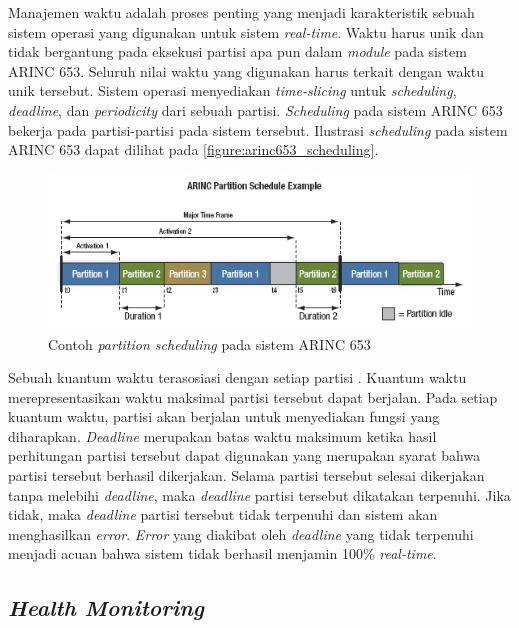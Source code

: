 Manajemen waktu adalah proses penting yang menjadi karakteristik sebuah sistem operasi yang
digunakan untuk sistem \textit{real-time}. Waktu harus unik dan tidak bergantung pada eksekusi
partisi apa pun dalam \textit{module} pada sistem ARINC 653. Seluruh nilai waktu yang digunakan
harus terkait dengan waktu unik tersebut. Sistem operasi menyediakan \textit{time-slicing}
untuk \textit{scheduling}, \textit{deadline}, dan \textit{periodicity} dari sebuah partisi.
\textit{Scheduling} pada sistem ARINC 653 bekerja pada partisi-partisi pada sistem tersebut.
Ilustrasi \textit{scheduling} pada sistem ARINC 653 dapat dilihat pada
\autoref{figure:arinc653_scheduling}.

\begin{figure}[htbp]
    \centering
    \includegraphics[scale=0.8]{resources/arinc653_scheduling.jpg}
    \caption[Contoh \textit{partition scheduling} pada sistem ARINC 653]{Contoh \textit{partition scheduling} pada sistem ARINC 653 \citep{Larry2009}}
    \label{figure:arinc653_scheduling}
\end{figure}

Sebuah kuantum waktu terasosiasi dengan setiap partisi \citep{Larry2009}. Kuantum waktu merepresentasikan waktu
maksimal partisi tersebut dapat berjalan. Pada setiap kuantum waktu, partisi akan berjalan untuk
menyediakan fungsi yang diharapkan. \textit{Deadline} merupakan batas waktu maksimum ketika
hasil perhitungan partisi tersebut dapat digunakan yang merupakan syarat bahwa partisi tersebut
berhasil dikerjakan. Selama partisi tersebut selesai dikerjakan tanpa melebihi
\textit{deadline}, maka \textit{deadline} partisi tersebut dikatakan terpenuhi. Jika tidak, maka
\textit{deadline} partisi tersebut tidak terpenuhi dan sistem akan menghasilkan \textit{error}.
\textit{Error} yang diakibat oleh \textit{deadline} yang tidak terpenuhi menjadi acuan bahwa
sistem tidak berhasil menjamin 100\% \textit{real-time}.

\subsection{\textit{Health Monitoring}}
\label{section:health_monitoring}

